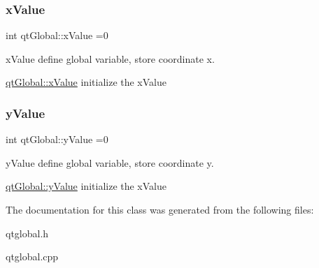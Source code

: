 \subsubsection{\texorpdfstring{xValue}{xValue}}
{\footnotesize\ttfamily int qt\+Global\+::x\+Value =0\hspace{0.3cm}{\ttfamily [static]}}



x\+Value define global variable, store coordinate x. 

\mbox{\hyperlink{classqt_global_af799abd19955f1153c053c419f2d81da}{qt\+Global\+::x\+Value}} initialize the x\+Value \mbox{\label{classqt_global_acf4d282719f7792728eb450ba35a5d08}} 
\subsubsection{\texorpdfstring{yValue}{yValue}}
{\footnotesize\ttfamily int qt\+Global\+::y\+Value =0\hspace{0.3cm}{\ttfamily [static]}}



y\+Value define global variable, store coordinate y. 

\mbox{\hyperlink{classqt_global_acf4d282719f7792728eb450ba35a5d08}{qt\+Global\+::y\+Value}} initialize the x\+Value 

The documentation for this class was generated from the following files\+:\begin{DoxyCompactItemize}
\item 
qtglobal.\+h\item 
qtglobal.\+cpp\end{DoxyCompactItemize}
